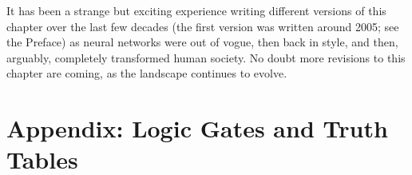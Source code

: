 It has been a strange but exciting experience writing different versions of this chapter over the last few decades (the first version was written around 2005; see the Preface) as neural networks were out of vogue, then back in style, and then, arguably, completely transformed human society. No doubt more revisions to this chapter are coming, as the landscape continues to evolve.

% 
%
%

\section{Appendix: Logic Gates and Truth Tables}\label{ch_logicgates}

